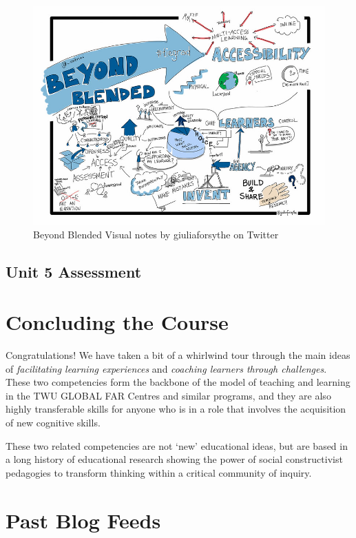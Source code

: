 \documentclass[
]{book}
\begin{document}
\begin{figure}
\centering
\includegraphics{assets/U5/U5LAImage.jpg}
\caption{Beyond Blended Visual notes by giuliaforsythe on Twitter}
\end{figure}

\hypertarget{unit-5-assessment}{%
\section*{Unit 5 Assessment}\label{unit-5-assessment}}

\hypertarget{concluding-the-course}{%
\chapter{Concluding the Course}\label{concluding-the-course}}

Congratulations! We have taken a bit of a whirlwind tour through the main ideas of \emph{facilitating learning experiences} and \emph{coaching learners through challenges}. These two competencies form the backbone of the model of teaching and learning in the TWU GLOBAL FAR Centres and similar programs, and they are also highly transferable skills for anyone who is in a role that involves the acquisition of new cognitive skills.

These two related competencies are not `new' educational ideas, but are based in a long history of educational research showing the power of social constructivist pedagogies to transform thinking within a critical community of inquiry.

\hypertarget{past-blog-feeds}{%
\chapter*{Past Blog Feeds}\label{past-blog-feeds}}
\end{document}
